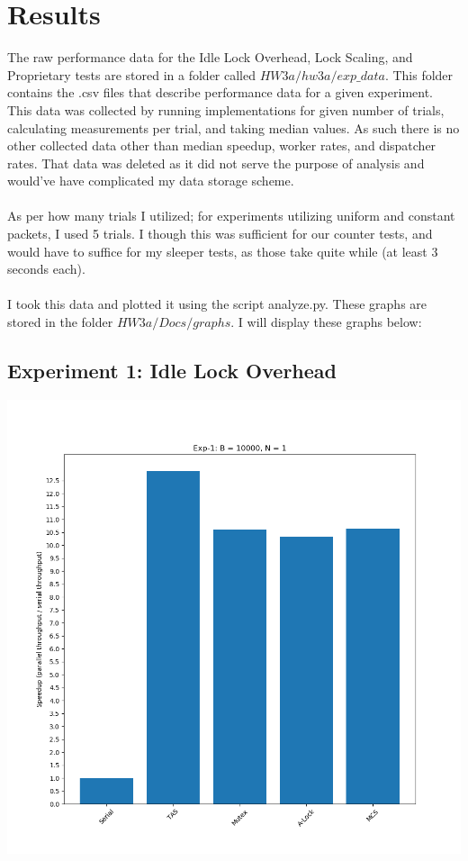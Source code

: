 \documentclass[]{article}
\begin{document}
\section{Results}
The raw performance data for the Idle Lock Overhead, Lock Scaling, and Proprietary tests are stored in a folder called $HW3a/hw3a/exp\_data$. This folder contains the .csv files that describe performance data for a given experiment. This data was collected by running implementations for given number of trials, calculating measurements per trial, and taking median values. As such there is no other collected data other than median speedup, worker rates, and dispatcher rates. That data was deleted as it did not serve the purpose of analysis and would've have complicated my data storage scheme.
\\\\
As per how many trials I utilized; for experiments utilizing uniform and constant packets, I used 5 trials. I though this was sufficient for our counter tests, and would have to suffice for my sleeper tests, as those take quite while (at least 3 seconds each).
\\\\
I took this data and plotted it using the script analyze.py. These graphs are stored in the folder $HW3a/Docs/graphs$. I will display these graphs below:

\subsection{Experiment 1: Idle Lock Overhead}
\includegraphics[scale=0.5]{graphs/exp1.png}\\
\end{document}
